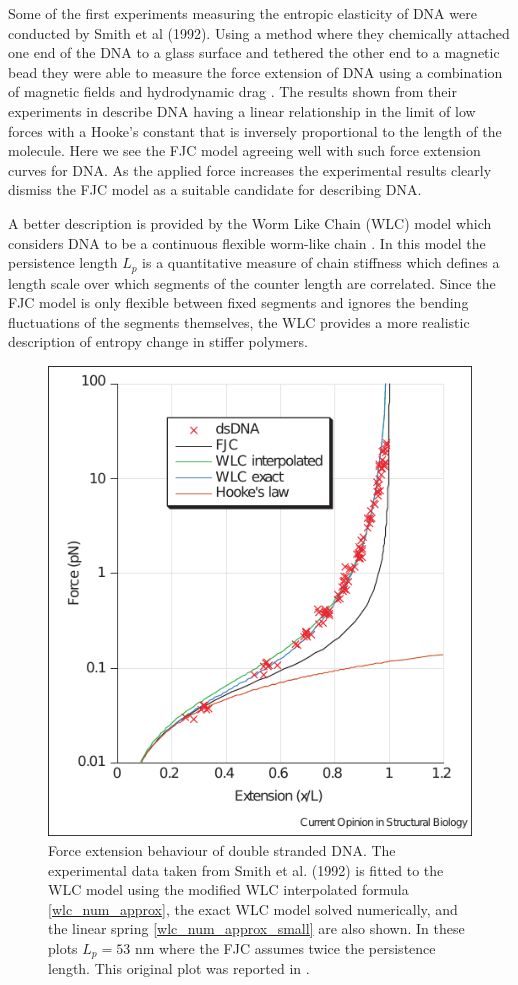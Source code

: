 Some of the first experiments measuring the entropic elasticity of DNA were conducted by Smith et al (1992). Using a method where they chemically attached one end of the DNA to a glass surface and tethered the other end to a magnetic bead they were able to measure the force extension of DNA using a combination of magnetic fields and hydrodynamic drag \cite{Smith1992}. The results shown from their experiments in  describe DNA having a linear relationship in the limit of low forces with a Hooke's constant that is inversely proportional to the length of the molecule. Here we see the FJC model agreeing well with such force extension curves for DNA. As the applied force increases the experimental results clearly dismiss the FJC model as a suitable candidate for describing DNA.

A better description is provided by the Worm Like Chain (WLC) model which considers DNA to be a continuous flexible worm-like chain \cite{Marko1995}. In this model the persistence length $L_{p}$ is a quantitative measure of chain stiffness which defines a length scale over which segments of the counter length are correlated. Since the FJC model is only flexible between fixed segments and ignores the bending fluctuations of the segments themselves, the WLC provides a more realistic description of entropy change in stiffer polymers. 
%
\begin{figure}[h]
\centering
\includegraphics[scale=1]{Graphics/DNA/fig1_Bustamante2000.pdf}
\caption{Force extension behaviour of double stranded DNA. The experimental data taken from Smith et al. (1992) is fitted to the WLC model using the modified WLC interpolated formula \eqref{wlc_num_approx}, the exact WLC model solved numerically, and the linear spring \eqref{wlc_num_approx_small} are also shown. In these plots $L_{p}=53$ nm where the FJC assumes twice the persistence length. This original plot was reported in \cite{Bustamante2000}.}
\label{fig:fig1_Bustamante2000}
\end{figure}
